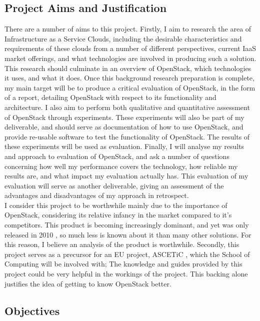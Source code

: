 \subsection{Project Aims and Justification}

There are a number of aims to this project. Firstly, I aim to research the area of Infrastructure as a Service Clouds, including the desirable characteristics and requirements of these clouds from a number of different perspectives, current IaaS market offerings, and what technologies are involved in producing such a solution. This research should culminate in an overview of OpenStack, which technologies it uses, and what it does. Once this background research preparation is complete, my main target will be to produce a critical evaluation of OpenStack, in the form of a report, detailing OpenStack with respect to its functionality and architecture. I also aim to perform both qualitative and quantitative assessment of OpenStack through experiments. These experiments will also be part of my deliverable, and should serve as documentation of how to use OpenStack, and provide re-usable software to test the functionality of OpenStack. The results of these experiments will be used as evaluation. Finally, I will analyse my results and approach to evaluation of OpenStack, and ask a number of questions concerning how well my performance covers the technology, how reliable my results are, and what impact my evaluation actually has. This evaluation of my evaluation will serve as another deliverable, giving an assessment of the advantages and disadvantages of my approach in retrospect.  \\ 
I consider this project to be worthwhile mainly due to the importance of OpenStack, considering its relative infancy in the market compared to it's competitors. This product is becoming increasingly dominant, and yet was only released in 2010 \cite{Piatt10}, so much less is known about it than many other solutions. For this reason, I believe an analysis of the product is worthwhile. Secondly, this project serves as a precursor for an EU project, ASCETiC \cite{ascetic}, which the School of Computing will be involved with; The knowledge and guides provided by this project could be very helpful in the workings of the project. This backing alone justifies the idea of getting to know OpenStack better. 

\subsection{Objectives}

